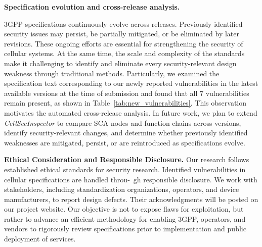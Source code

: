 \documentclass[sigconf]{acmart}
\newcommand{\lm}{\textit{CellSecInspector}\xspace}
\begin{document}
{\noindent\textbf{Specification evolution and cross-release analysis.} 

3GPP specifications continuously evolve across releases. Previously identified security issues may persist, be partially mitigated, or be eliminated by later revisions. These ongoing efforts are essential for strengthening the security of cellular systems. At the same time, the scale and complexity of the standards make it challenging to identify and eliminate every security-relevant design weakness through traditional methods. Particularly, we examined the specification text corresponding to our newly reported vulnerabilities in the latest available versions at the time of submission and found that all 7 vulnerabilities remain present, as shown in Table~\ref{tab:new_vulnerabilities}. This observation motivates the automated cross-release analysis. In future work, we plan to extend \lm to compare SCA nodes and function chains across versions, identify security-relevant changes, and determine whether previously identified weaknesses are mitigated, persist, or are reintroduced as specifications evolve.






\noindent\textbf{Ethical Consideration and Responsible Disclosure.}
Our research follows established ethical standards for security research. Identified vulnerabilities in cellular specifications are handled throu-\ gh responsible disclosure.
We work with stakeholders, including standardization organizations, operators, and device manufacturers, to report design defects. Their acknowledgments will be posted on our project website.
Our objective is not to expose flaws for exploitation, but rather to advance an efficient methodology for enabling 3GPP, operators, and vendors to rigorously review specifications prior to implementation and public deployment of services. 




}
\end{document}
